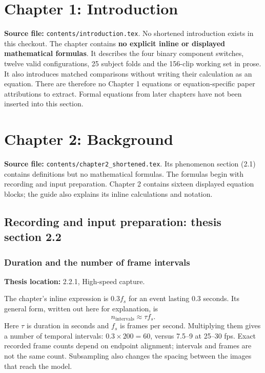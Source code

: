 \documentclass[11pt,a4paper]{article}
\numberwithin{equation}{section}
\begin{document}
\tableofcontents
\clearpage

\section{Chapter 1: Introduction}
\label{fg:chapter1}

\textbf{Source file:} \texttt{contents/introduction.tex}. No shortened
introduction exists in this checkout. The chapter contains \textbf{no explicit
inline or displayed mathematical formulas}. It describes the four binary
component switches, twelve valid configurations, 25 subject folds and the
156-clip working set in prose. It also introduces matched comparisons without
writing their calculation as an equation. There are therefore no Chapter 1
equations or equation-specific paper attributions to extract. Formal equations
from later chapters have not been inserted into this section.

\section{Chapter 2: Background}
\label{fg:chapter2}

\textbf{Source file:} \texttt{contents/chapter2\_shortened.tex}. Its phenomenon
section (2.1) contains definitions but no mathematical formulas. The formulas
begin with recording and input preparation. Chapter 2 contains sixteen displayed
equation blocks; the guide also explains its inline calculations and notation.

\subsection{Recording and input preparation: thesis section 2.2}

\subsubsection{Duration and the number of frame intervals}
\label{fg:capture}
\textbf{Thesis location:} 2.2.1, High-speed capture.

The chapter's inline expression is $0.3f_s$ for an event lasting $0.3$ seconds.
Its general form, written out here for explanation, is
\begin{equation}
    n_{\mathrm{intervals}}\approx \tau f_s.
    \label{fg:eq:capture}
\end{equation}
Here $\tau$ is duration in seconds and $f_s$ is frames per second. Multiplying
them gives a number of temporal intervals: $0.3\times200=60$, versus 7.5--9 at
25--30 fps. Exact recorded frame counts depend on endpoint alignment; intervals
and frames are not the same count. Subsampling also changes the spacing between
the images that reach the model.
\end{document}
